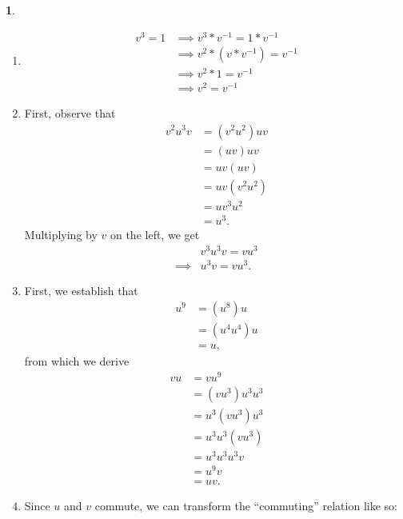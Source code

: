 \documentclass[12pt]{article}
\theoremstyle{definition}
\newtheorem{ex}{}
\begin{document}
\begin{ex}
	\begin{enumerate}[label=(\alph*)]
		\item \begin{align*}
			      v^3 = 1 & \implies v^3 * v^{-1} = 1 * v^{-1}   \\
			              & \implies v^2 * (v * v^{-1}) = v^{-1} \\
			              & \implies v^2 * 1 = v^{-1}            \\
			              & \implies v^2 = v^{-1}
		      \end{align*}
		\item First, observe that \begin{align*}
			      v^2u^3v & = (v^2u^2)uv \\
			              & = (uv)uv     \\
			              & = uv(uv)     \\
			              & = uv(v^2u^2) \\
			              & = uv^3u^2    \\
			              & = u^3.
		      \end{align*}
		      Multiplying by $v$ on the left, we get \begin{align*}
			               & v^3u^3v  = vu^3 \\
			      \implies & u^3v = vu^3.
		      \end{align*}
		\item First, we establish that \begin{align*}
			      u^9 & = (u^8)u    \\
			          & = (u^4u^4)u \\
			          & = u,
		      \end{align*}
		      from which we derive \begin{align*}
			      vu & = vu^9         \\
			         & = (vu^3)u^3u^3 \\
			         & = u^3(vu^3)u^3 \\
			         & = u^3u^3(vu^3) \\
			         & = u^3u^3u^3v   \\
			         & = u^9v         \\
			         & = uv.
		      \end{align*}
		\item Since $u$ and $v$ commute, we can transform the ``commuting'' relation like so: \begin{align*}

\end{align*}
\end{enumerate}
\end{ex}
\end{document}
